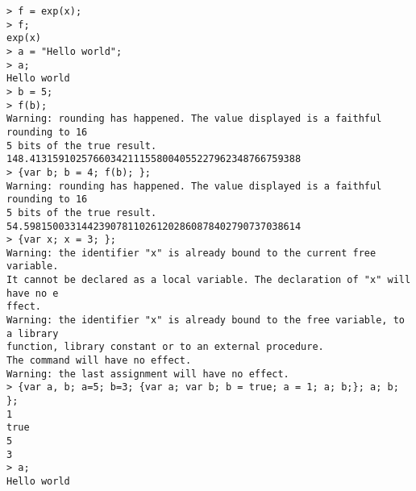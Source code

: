 \begin{center}\begin{minipage}{15cm}\begin{Verbatim}[frame=single]
> f = exp(x);
> f;
exp(x)
> a = "Hello world";
> a;
Hello world
> b = 5;
> f(b);
Warning: rounding has happened. The value displayed is a faithful rounding to 16
5 bits of the true result.
148.41315910257660342111558004055227962348766759388
> {var b; b = 4; f(b); };
Warning: rounding has happened. The value displayed is a faithful rounding to 16
5 bits of the true result.
54.598150033144239078110261202860878402790737038614
> {var x; x = 3; };
Warning: the identifier "x" is already bound to the current free variable.
It cannot be declared as a local variable. The declaration of "x" will have no e
ffect.
Warning: the identifier "x" is already bound to the free variable, to a library 
function, library constant or to an external procedure.
The command will have no effect.
Warning: the last assignment will have no effect.
> {var a, b; a=5; b=3; {var a; var b; b = true; a = 1; a; b;}; a; b; };
1
true
5
3
> a;
Hello world
\end{Verbatim}
\end{minipage}\end{center}
